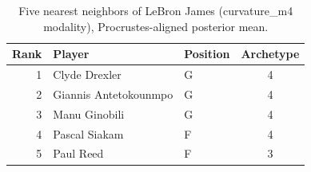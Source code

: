 \begin{table}[htbp]
  \centering\small
  \begin{tabular}{rllc}
    \toprule
    Rank & Player & Position & Archetype \\
    \midrule
    1 & Clyde Drexler & G & 4 \\
    2 & Giannis Antetokounmpo & G & 4 \\
    3 & Manu Ginobili & G & 4 \\
    4 & Pascal Siakam & F & 4 \\
    5 & Paul Reed & F & 3 \\
    \bottomrule
  \end{tabular}
  \caption{Five nearest neighbors of LeBron James (curvature_m4 modality), Procrustes-aligned posterior mean.}
  \label{tab:LeBron_James_neighbors_curvature_m4}
\end{table}

